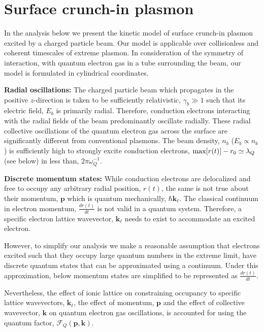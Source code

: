 \documentclass[aps,twocolumn,notitlepage,superscriptaddress]{revtex4-1}
\renewcommand\vec{\mathbf}
\begin{document}
\section{Surface crunch-in plasmon}
\label{sec:kinetic-model}
 
In the analysis below we present the kinetic model of surface crunch-in plasmon excited by a charged particle beam. Our model is applicable over collisionless and coherent timescales of extreme plasmon. In consideration of the symmetry of interaction, with quantum electron gas in a tube surrounding the beam, our model is formulated in cylindrical coordinates.

{\bf Radial oscillations:} The charged particle beam which propagates in the positive $z$-direction is taken to be sufficiently relativistic, $\gamma_b\gg1$ such that its electric field, $E_b$ is primarily radial. Therefore, conduction electrons interacting with the radial fields of the beam predominantly oscillate radially. These radial collective oscillations of the quantum electron gas across the surface are significantly different from conventional plasmons. The beam density, $n_b$ ($E_b\propto n_b$) is sufficiently high to strongly excite conduction electrons, ${\rm max}[r(t)]-r_0\simeq\lambda_Q$ (see below) in less than, $2\pi\omega_Q^{-1}$.

{\bf Discrete momentum states:} While conduction electrons are delocalized and free to occupy any arbitrary radial position, $r(t)$, the same is not true about their momentum, $\vec{p}$ which is quantum mechanically, $\hbar\vec{k_\ell}$. The classical continuum in electron momentum, $\frac{dr(t)}{dt}$ is not valid in a quantum system. Therefore, a specific electron lattice wavevector, $\vec{k}_\ell$ needs to exist to accommodate an excited electron. 

However, to simplify our analysis we make a reasonable assumption that electrons excited such that they occupy large quantum numbers in the extreme limit, have discrete quantum states that can be approximated using a continuum. Under this approximation, below momentum states are simplified to be represented as $\frac{dr(t)}{dt}$. 

Nevertheless, the effect of ionic lattice on constraining occupancy to specific lattice wavevectors, $\vec{k}_\ell$, the effect of momentum, $\vec{p}$ and the effect of collective wavevector, $\vec{k}$ on quantum electron gas oscillations, is accounted for using the quantum factor, $\mathscr{F}_Q(\vec{p},\vec{k})$.
\end{document}
